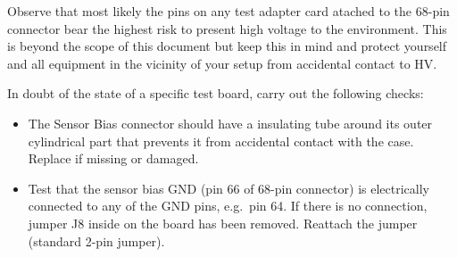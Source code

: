 Observe that most likely the pins on any test adapter card atached to the 68-pin connector bear the highest risk to present high voltage to the environment. This is beyond the scope of this document but keep this in mind and protect yourself and all equipment in the vicinity of your setup from accidental contact to HV.

In doubt of the state of a specific test board, carry out the following checks:
\begin{itemize}
    \item The Sensor Bias connector should have a insulating tube around its outer cylindrical part that prevents it from accidental contact with the case. Replace if missing or damaged.
    \item Test that the sensor bias GND (pin 66 of 68-pin connector) is electrically connected to any of the GND pins, e.g.~pin 64. If there is no connection, jumper J8 inside on the board has been removed. Reattach the jumper (standard 2-pin jumper).
\end{itemize}

